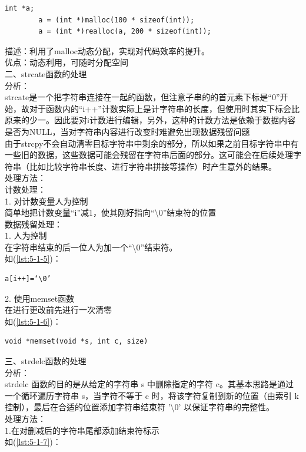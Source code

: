 \documentclass[supercite]{Experimental_Report}
\theoremstyle{definition}
\begin{document}
	\begin{lstlisting}[style=commonCodeStyle, caption={示例}, label={lst:5-1-4}]
		int *a;
		a = (int *)malloc(100 * sizeof(int));
		a = (int *)realloc(a, 200 * sizeof(int));
	\end{lstlisting}
	描述：利用了malloc动态分配，实现对代码效率的提升。\\
	优点：动态利用，可随时分配空间\\

    二、strcate函数的处理\\
	分析：\\
	    strcate是一个把字符串连接在一起的函数，但注意子串的的首元素下标是“0”开始，故对于函数内的“i++”计数实际上是计字符串的长度，但使用时其实下标会比原来的少一。因此要对i计数进行编辑，另外，这种的计数方法是依赖于数据内容是否为NULL，当对字符串内容进行改变时难避免出现数据残留问题
	\\由于strcpy不会自动清零目标字符串中剩余的部分，所以如果之前目标字符串中有一些旧的数据，这些数据可能会残留在字符串后面的部分。这可能会在后续处理字符串（比如比较字符串长度、进行字符串拼接等操作）时产生意外的结果。\\
	处理方法：\\
	计数处理：\\
	1.	对计数变量人为控制\\
	简单地把计数变量“i”减1，使其刚好指向“\textbackslash0”结束符的位置\\
	数据残留处理：\\
	1.	人为控制\\
	在字符串结束的后一位人为加一个“\textbackslash0”结束符。\\
	如(\ref{lst:5-1-5})：
	\begin{lstlisting}[style=commonCodeStyle, caption={示例}, label={lst:5-1-5}]
		a[i++]=‘\0’
	\end{lstlisting}
	2.	使用memset函数\\
	在进行更改前先进行一次清零\\
	如(\ref{lst:5-1-6})：
	\begin{lstlisting}[style=commonCodeStyle, caption={示例}, label={lst:5-1-6}]
		void *memset(void *s, int c, size)
	\end{lstlisting}

    三、strdelc函数的处理\\
	分析：\\
	strdelc 函数的目的是从给定的字符串 s 中删除指定的字符 c。其基本思路是通过一个循环遍历字符串 s，当字符不等于 c 时，将该字符复制到新的位置（由索引 k 控制），最后在合适的位置添加字符串结束符 '\textbackslash0' 以保证字符串的完整性。\\
	处理方法：\\	
	1.在对删减后的字符串尾部添加结束符标示\\
	如(\ref{lst:5-1-7})：\\
	
\end{document}

